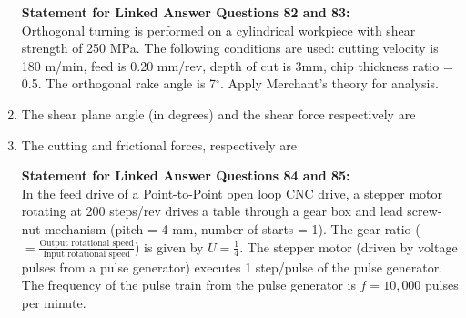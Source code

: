 \documentclass[journal,12pt,onecolumn]{IEEEtran}
\begin{document}
\begin{enumerate}
          \normalsize\textbf{Statement for Linked Answer Questions 82 and 83:}\\
          Orthogonal turning is performed on a cylindrical workpiece with shear strength of 250 MPa. The following conditions are used: cutting velocity is 180 m/min, feed is 0.20 mm/rev, depth of cut is 3mm, chip thickness ratio = 0.5. The orthogonal rake angle is 7$^\circ$. Apply Merchant's theory for analysis.
    \item The shear plane angle (in degrees) and the shear force respectively are\\

          \begin{enumerate}
          \end{enumerate}

    \item The cutting and frictional forces, respectively are\\

          \begin{enumerate}
          \end{enumerate}

          \normalsize\textbf{Statement for Linked Answer Questions 84 and 85:}\\
          In the feed drive of a Point-to-Point open loop CNC drive, a stepper motor rotating at 200 steps/rev drives a table through a gear box and lead screw-nut mechanism (pitch = 4 mm, number of starts = 1). The gear ratio ($=\frac{\text{Output rotational speed}}{\text{Input rotational speed}}$) is given by $U=\frac{1}{4}$. The stepper motor (driven by voltage pulses from a pulse generator) executes 1 step/pulse of the pulse generator. The frequency of the pulse train from the pulse generator is $f=10,000$ pulses per minute.


\end{enumerate}
\end{document}
